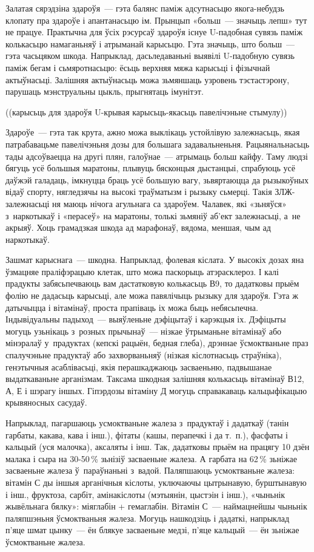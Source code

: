 Залатая сярэдзіна здароўя~--- гэта балянс паміж адсутнасьцю якога-небудзь клопату пра здароўе і апантанасьцю ім. Прынцып «больш~--- значыць лепш» тут не працуе. Практычна для ўсіх рэсурсаў здароўя існуе U-падобная сувязь паміж колькасьцю намаганьняў і атрыманай карысьцю. Гэта значыць, што больш~--- гэта часьцяком шкода. Напрыклад, дасьледаваньні выявілі U-падобную сувязь паміж бегам і сьмяротнасьцю: ёсьць верхняя мяжа карысьці і фізычнай актыўнасьці. Залішняя актыўнасьць можа зьмяншаць узровень тэстастэрону, парушаць мэнструальны цыкль, прыгнятаць імунітэт.

((карысьць для здароўя U-крывая карысьць-якасьць павелічэньне стымулу))

Здароўе~--- гэта так крута, ажно можа выклікаць устойлівую залежнасьць, якая патрабавацьме павелічэньня дозы для большага задавальненьня. Рацыянальнасьць тады адсоўваецца на другі плян, галоўнае~--- атрымаць больш кайфу. Таму людзі бягуць усё большыя маратоны, плывуць бясконцыя дыстанцыі, спрабуюць усё даўжэй галадаць, імкнуцца браць усё большую вагу, зьвяртаюцца да рызыкоўных відаў спорту, нягледзячы на высокі траўматызм і рызыку сьмерці. Такія ЗЛЖ-залежнасьці ня маюць нічога агульнага са здароўем. Чалавек, які «зьняўся» з~наркотыкаў і «перасеў» на маратоны, толькі зьмяніў аб'ект залежнасьці, а~не акрыяў. Хоць грамадзкая шкода ад марафонаў, вядома, меншая, чым ад наркотыкаў.

Зашмат карыснага~--- шкодна. Напрыклад, фолевая кіслата. У высокіх дозах яна ўзмацняе праліфэрацыю клетак, што можа паскорыць атэрасклероз. І калі прадукты забясьпечваюць вам дастатковую колькасьць В9, то дадатковы прыём фолію не дадасьць карысьці, але можа павялічыць рызыку для здароўя. Гэта ж датычыцца і вітамінаў, проста прапіваць іх можа быць небясьпечна. Індывідуальны падыход~--- выяўленьне дэфіцытаў і карэкцыя іх. Дэфіцыты могуць узьнікаць з~розных прычынаў~--- нізкае ўтрыманьне вітамінаў або мінэралаў у~прадуктах (кепскі рацыён, бедная глеба), дрэннае ўсмоктваньне праз спалучэньне прадуктаў або захворваньняў (нізкая кіслотнасьць страўніка), генэтычныя асаблівасьці, якія перашкаджаюць засваеньню, падвышанае выдаткаваньне арганізмам. Таксама шкодная залішняя колькасьць вітамінаў В12, А, Е і шэрагу іншых. Гіпэрдозы вітаміну Д могуць справакаваць кальцыфікацыю крывяносных сасудаў.

Напрыклад, пагаршаюць усмоктваньне жалеза з~прадуктаў і дадаткаў (танін гарбаты, какава, кава і інш.), фітаты (кашы, перапечкі і да т.~п.), фасфаты і кальцый (уся малочка), аксаляты і інш. Так, дадатковы прыём на працягу 10 дзён малака і сыра на 30-50\,\% зьнізіў засваеньне жалеза. А гарбата на 62\,\% зьніжае засваеньне жалеза ў~параўнаньні з~вадой. Паляпшаюць усмоктваньне жалеза: вітамін С ды іншыя арганічныя кіслоты, уключаючы цытрынавую, бурштынавую і інш., фруктоза, сарбіт, амінакіслоты (мэтыянін, цыстэін і інш.), «чыньнік жывёльнага бялку»: міяглабін + гемаглабін. Вітамін С~--- наймацнейшы чыньнік паляпшэньня ўсмоктваньня жалеза. Могуць нашкодзіць і дадаткі, напрыклад п'яце шмат цынку~--- ён блякуе засваеньне медзі, п'яце кальцый~--- ён зьніжае ўсмоктваньне жалеза.

